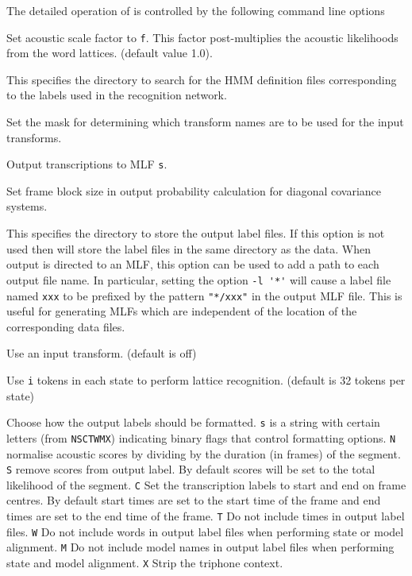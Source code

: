 The detailed operation of  is controlled by the following
command line options
\begin{optlist}

   Set acoustic scale factor to \texttt{f}.
                This factor post-multiplies the acoustic likelihoods
                from the word lattices.  (default value 1.0).

   This specifies the directory to search for the
        HMM definition files corresponding to the labels used in
        the recognition network.

   Set the mask for determining which transform names are 
	to be used for the input transforms. 

   Output transcriptions to MLF \texttt{s}.

   Set frame block size in output probability calculation for
  diagonal covariance systems.

   This specifies the directory to store the  output label 
        files.  If this option is not used then  will store 
        the label files in the same directory as the data. 
        When output is directed to an MLF, this option can be used to
      add a path to each output file name.  In particular, setting the option
      \verb+-l '*'+ will cause a label file named \texttt{xxx} to be prefixed
      by the pattern \verb+"*/xxx"+ in the output MLF file.  This is useful
      for generating MLFs which are independent of the location of the 
      corresponding data files.

   Use an input transform. (default is off)

   Use \texttt{i} tokens in each state to perform
        lattice recognition. (default is 32 tokens per state)

   Choose how the output labels should be formatted.
        \texttt{s} is a string with certain letters (from \texttt{NSCTWMX}) 
        indicating binary flags that control formatting options. 
        \texttt{N} normalise acoustic scores by dividing by the duration
        (in frames) of the segment.
        \texttt{S} remove scores from output label.  By default 
        scores will be set to the total likelihood of the segment.
        \texttt{C} Set the transcription labels to start and end on
        frame centres. By default start times are set to the start
        time of the frame and end times are set to the end time of 
        the frame.
        \texttt{T} Do not include times in output label files.
        \texttt{W} Do not include words in output label files
        when performing state or model alignment.
        \texttt{M} Do not include model names in output label
        files when performing state and model alignment.
        \texttt{X} Strip the triphone context.


\end{optlist}
